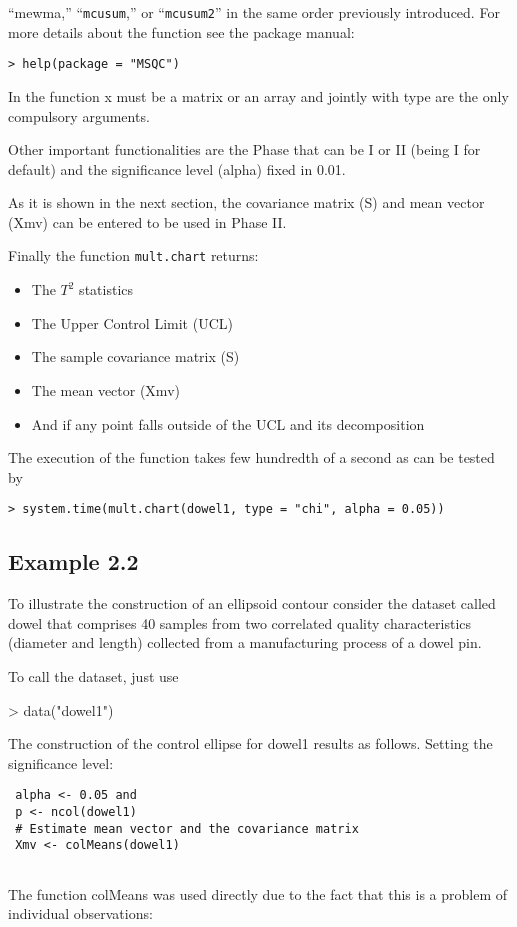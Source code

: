 \documentclass[a4paper,12pt]{article}
\begin{document}




“mewma,” “\texttt{mcusum},” or “\texttt{mcusum2}” in the same order previously introduced.
For more details about the function see the package manual:
\begin{verbatim}
> help(package = "MSQC")
\end{verbatim}

In the function x must be a matrix or an array and jointly with type are the only compulsory arguments.

Other important functionalities are the Phase that can be I or II (being I for default) and the significance level (alpha) fixed in 0.01.

As it is shown in the next section, the covariance matrix (S) and mean vector (Xmv) can be entered to be used in Phase II.

Finally the function \texttt{mult.chart} returns:
\begin{itemize}
\item  The $T^2$ statistics
\item The Upper Control Limit (UCL)
\item The sample covariance matrix (S)
\item The mean vector (Xmv)
\item And if any point falls outside of the UCL and its decomposition
\end{itemize}
The execution of the function takes few hundredth of a second as can be tested by
\begin{verbatim}
> system.time(mult.chart(dowel1, type = "chi", alpha = 0.05))
\end{verbatim}



\subsection*{Example 2.2}
To illustrate the construction of an ellipsoid contour consider the dataset called
dowel that comprises 40 samples from two correlated quality characteristics (diameter
and length) collected from a manufacturing process of a dowel pin.



To call the dataset, just use

> data("dowel1")

The construction of the control ellipse for dowel1 results as follows. Setting the significance level:
\begin{verbatim}
 alpha <- 0.05 and
 p <- ncol(dowel1)
 # Estimate mean vector and the covariance matrix
 Xmv <- colMeans(dowel1)
 
\end{verbatim}
The function colMeans was used directly due to the fact that this is a problem of
individual observations:
\end{document}
